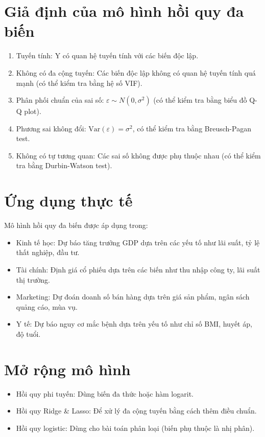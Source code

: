 \section{Giả định của mô hình hồi quy đa biến}
\begin{enumerate}
    \item Tuyến tính: Y có quan hệ tuyến tính với các biến độc lập.
    \item Không có đa cộng tuyến: Các biến độc lập không có quan hệ tuyến tính quá mạnh (có thể kiểm tra bằng hệ số VIF).
    \item Phân phối chuẩn của sai số: $\varepsilon \sim N(0,\sigma^2)$ (có thể kiểm tra bằng biểu đồ Q-Q plot).
    \item Phương sai không đổi: $\text{Var}(\varepsilon) = \sigma^2$, có thể kiểm tra bằng Breusch-Pagan test.
    \item Không có tự tương quan: Các sai số không được phụ thuộc nhau (có thể kiểm tra bằng Durbin-Watson test).
\end{enumerate}

\section{Ứng dụng thực tế}
Mô hình hồi quy đa biến được áp dụng trong:
\begin{itemize}
    \item Kinh tế học: Dự báo tăng trưởng GDP dựa trên các yếu tố như lãi suất, tỷ lệ thất nghiệp, đầu tư.
    \item Tài chính: Định giá cổ phiếu dựa trên các biến như thu nhập công ty, lãi suất thị trường.
    \item Marketing: Dự đoán doanh số bán hàng dựa trên giá sản phẩm, ngân sách quảng cáo, mùa vụ.
    \item Y tế: Dự báo nguy cơ mắc bệnh dựa trên yếu tố như chỉ số BMI, huyết áp, độ tuổi.
\end{itemize}

\section{Mở rộng mô hình}
\begin{itemize}
    \item Hồi quy phi tuyến: Dùng biến đa thức hoặc hàm logarit.
    \item Hồi quy Ridge \& Lasso: Để xử lý đa cộng tuyến bằng cách thêm điều chuẩn.
    \item Hồi quy logistic: Dùng cho bài toán phân loại (biến phụ thuộc là nhị phân).
\end{itemize}